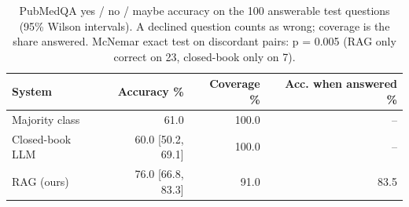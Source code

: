 \begin{table}[t]
\centering\small
\begin{tabular}{lrrr}
\toprule
System & Accuracy \% & Coverage \% & Acc. when answered \% \\
\midrule
Majority class & 61.0 & 100.0 & -- \\
Closed-book LLM & 60.0 [50.2, 69.1] & 100.0 & -- \\
RAG (ours) & 76.0 [66.8, 83.3] & 91.0 & 83.5 \\
\bottomrule
\end{tabular}
\caption{PubMedQA yes / no / maybe accuracy on the 100 answerable test questions (95\% Wilson intervals). A declined question counts as wrong; coverage is the share answered. McNemar exact test on discordant pairs: p = 0.005 (RAG only correct on 23, closed-book only on 7).}
\label{tab:decision}
\end{table}
